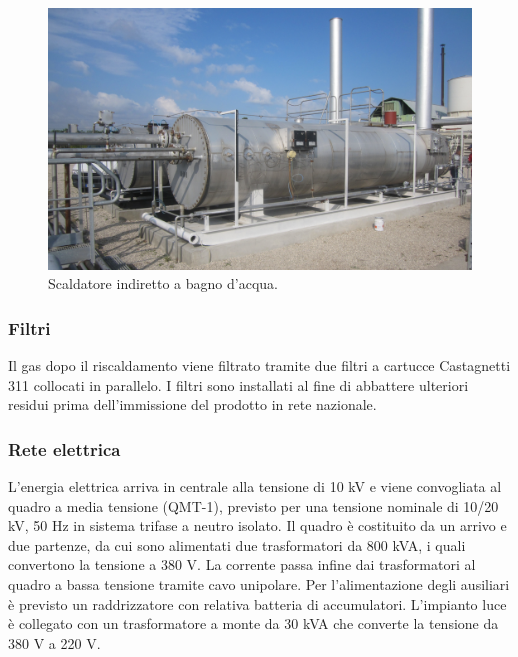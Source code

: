 \begin{figure}[htbp] %
    \centering
    \includegraphics[width=.7\textwidth]{fig/test/centrale/scaldatore}
    \caption{Scaldatore indiretto a bagno d'acqua.} 
    \label{fig:scaldatore}
\end{figure}

\subsubsection*{Filtri}
Il gas dopo il riscaldamento viene filtrato tramite due filtri a cartucce Castagnetti 311 collocati in parallelo. I filtri sono installati al fine di abbattere ulteriori residui prima dell'immissione del prodotto in rete nazionale.


\subsubsection*{Rete elettrica}
L'energia elettrica arriva in centrale alla tensione di 10 kV e viene convogliata al quadro a media tensione (QMT-1), previsto per una tensione nominale di 10/20 kV, 50 Hz in sistema trifase a neutro isolato. Il quadro è costituito da un arrivo e due partenze, da cui sono alimentati due trasformatori da 800 kVA, i quali convertono la tensione a 380 V. La corrente passa infine dai trasformatori al quadro a bassa tensione tramite cavo unipolare. Per l'alimentazione degli ausiliari è previsto un raddrizzatore con relativa batteria di accumulatori. L'impianto luce è collegato con un trasformatore a monte da 30 kVA che converte la tensione da 380 V a 220 V.

